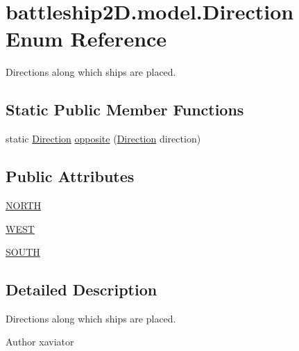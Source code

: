 \hypertarget{enumbattleship2D_1_1model_1_1Direction}{\section{battleship2\-D.\-model.\-Direction Enum Reference}
\label{enumbattleship2D_1_1model_1_1Direction}
}


Directions along which ships are placed.  


\subsection*{Static Public Member Functions}
\begin{DoxyCompactItemize}
\item 
static \hyperlink{enumbattleship2D_1_1model_1_1Direction}{Direction} \hyperlink{enumbattleship2D_1_1model_1_1Direction_a5142b10dc9a67b152707b7ee25cb4a5d}{opposite} (\hyperlink{enumbattleship2D_1_1model_1_1Direction}{Direction} direction)
\end{DoxyCompactItemize}
\subsection*{Public Attributes}
\begin{DoxyCompactItemize}
\item 
\hyperlink{enumbattleship2D_1_1model_1_1Direction_aedb04206b9e30ae29b3890ff2fc8449f}{N\-O\-R\-T\-H}
\item 
\hyperlink{enumbattleship2D_1_1model_1_1Direction_a2265bde02350197fca66c08e88c5db8a}{W\-E\-S\-T}
\item 
\hyperlink{enumbattleship2D_1_1model_1_1Direction_ae3b60a67e1c1c9005c6abee5ef5dde95}{S\-O\-U\-T\-H}
\end{DoxyCompactItemize}


\subsection{Detailed Description}
Directions along which ships are placed. 

\begin{DoxyAuthor}{Author}
xaviator 
\end{DoxyAuthor}


